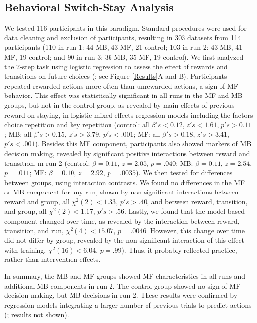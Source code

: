 \documentclass[11pt]{article} %
\begin{document}
\subsection{Behavioral Switch-Stay Analysis}
We tested 116 participants in this paradigm. Standard procedures were used for data cleaning and exclusion of participants, resulting in 303 datasets from 114 participants (110 in run 1: 44 MB, 43 MF, 21 control; 103 in run 2: 43 MB, 41 MF, 19 control; and 90 in run 3: 36 MB, 35 MF, 19 control). We first analyzed the 2-step task using logistic regression to assess the effect of rewards and transitions on future choices (\cite{akam_simple_2015}; see Figure \ref{Results}A and B). Participants repeated rewarded actions more often than unrewarded actions, a sign of MF behavior. This effect was statistically significant in all runs in the MF and MB groups, but not in the control group, as revealed by main effects of previous reward on staying, in logistic mixed-effects regression models including the factors choice repetition and key repetition (control: all $\beta's < 0.12$, $z's < 1.61$, $p's > 0.11$; MB: all $\beta's > 0.15$, $z's > 3.79$, $p's < .001$; MF: all $\beta's > 0.18$, $z's > 3.41$, $p's < .001$). Besides this MF component, participants also showed markers of MB decision making, revealed by significant positive interactions between reward and transition, in run 2 (control: $\beta = 0.11$, $z = 2.05$, $p = .040$; MB: $\beta = 0.11$, $z = 2.54$, $p = .011$; MF: $\beta = 0.10$, $z = 2.92$, $p = .0035$). We then tested for differences between groups, using interaction contrasts. We found no differences in the MF or MB component for any run, shown by non-significant interactions between reward and group, all $\chi^{2}(2) < 1.33$, $p's > .40$, and between reward, transition, and group, all $\chi^{2}(2) < 1.17$, $p's > .56$. Lastly, we found that the model-based component changed over time, as revealed by the interaction between reward, transition, and run, $\chi^{2}(4) < 15.07$, $p = .0046$. However, this change over time did not differ by group, revealed by the non-significant interaction of this effect with training, $\chi^{2}(16) < 6.04$, $p = .99$). Thus, it probably reflected practice, rather than intervention effects.  %

In summary, the MB and MF groups showed MF characteristics in all runs and additional MB components in run 2. The control group showed no sign of MF decision making, but MB decisions in run 2. These results were confirmed by regression models integrating a larger number of previous trials to predict actions (\cite{akam_simple_2015}; results not shown).
\end{document}
